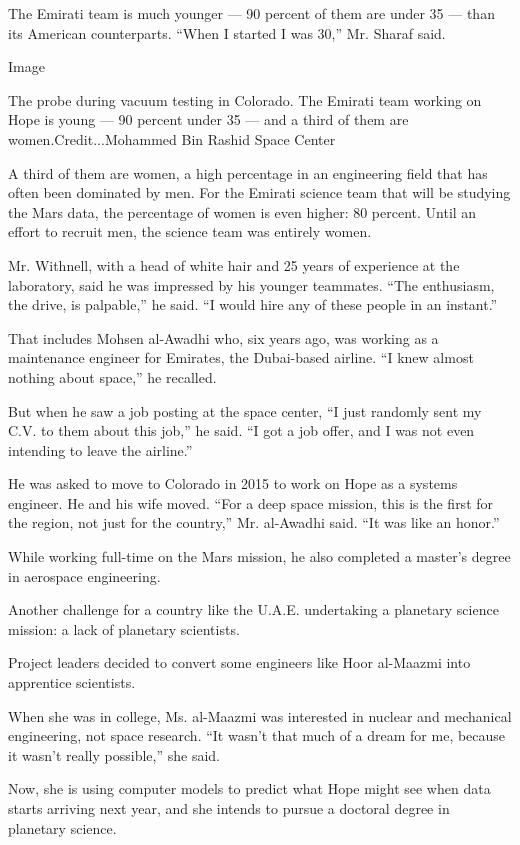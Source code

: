 The Emirati team is much younger --- 90 percent of them are under 35 ---
than its American counterparts. ``When I started I was 30,'' Mr. Sharaf
said.

Image

The probe during vacuum testing in Colorado. The Emirati team working on
Hope is young --- 90 percent under 35 --- and a third of them are
women.Credit...Mohammed Bin Rashid Space Center

A third of them are women, a high percentage in an engineering field
that has often been dominated by men. For the Emirati science team that
will be studying the Mars data, the percentage of women is even higher:
80 percent. Until an effort to recruit men, the science team was
entirely women.

Mr. Withnell, with a head of white hair and 25 years of experience at
the laboratory, said he was impressed by his younger teammates. ``The
enthusiasm, the drive, is palpable,'' he said. ``I would hire any of
these people in an instant.''

That includes Mohsen al-Awadhi who, six years ago, was working as a
maintenance engineer for Emirates, the Dubai-based airline. ``I knew
almost nothing about space,'' he recalled.

But when he saw a job posting at the space center, ``I just randomly
sent my C.V. to them about this job,'' he said. ``I got a job offer, and
I was not even intending to leave the airline.''

He was asked to move to Colorado in 2015 to work on Hope as a systems
engineer. He and his wife moved. ``For a deep space mission, this is the
first for the region, not just for the country,'' Mr. al-Awadhi said.
``It was like an honor.''

While working full-time on the Mars mission, he also completed a
master's degree in aerospace engineering.

Another challenge for a country like the U.A.E. undertaking a planetary
science mission: a lack of planetary scientists.

Project leaders decided to convert some engineers like Hoor al-Maazmi
into apprentice scientists.

When she was in college, Ms. al-Maazmi was interested in nuclear and
mechanical engineering, not space research. ``It wasn't that much of a
dream for me, because it wasn't really possible,'' she said.

Now, she is using computer models to predict what Hope might see when
data starts arriving next year, and she intends to pursue a doctoral
degree in planetary science.

